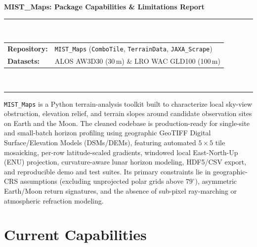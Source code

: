 \documentclass[11pt,letterpaper]{article}
\begin{document}
\noindent
{\LARGE\bfseries\color{navy} MIST\_Maps: Package Capabilities \& Limitations Report}\\[6pt]
\rule{\linewidth}{1.2pt}\\[6pt]
{\small
\begin{tabular}{@{}ll@{}}
  \textbf{Repository:} & \texttt{MIST\_Maps} (\texttt{ComboTile}, \texttt{TerrainData}, \texttt{JAXA\_Scrape}) \\
  \textbf{Datasets:} & ALOS AW3D30 (30\,m) \& LRO WAC GLD100 (100\,m) \\
\end{tabular}}\\[4pt]
\rule{\linewidth}{0.6pt}

\vspace{0.3cm}

\begin{tcolorbox}[colback=boxbg,colframe=navy,boxrule=0.8pt,title={\textbf{Executive Summary}}]
\texttt{MIST\_Maps} is a Python terrain-analysis toolkit built to characterize local sky-view obstruction, elevation relief, and terrain slopes around candidate observation sites on Earth and the Moon. The cleaned codebase is production-ready for single-site and small-batch horizon profiling using geographic GeoTIFF Digital Surface/Elevation Models (DSMs/DEMs), featuring automated $5\times 5$ tile mosaicking, per-row latitude-scaled gradients, windowed local East-North-Up (ENU) projection, curvature-aware lunar horizon modeling, HDF5/CSV export, and reproducible demo and test suites. Its primary constraints lie in geographic-CRS assumptions (excluding unprojected polar grids above $79^\circ$), asymmetric Earth/Moon return signatures, and the absence of sub-pixel ray-marching or atmospheric refraction modeling.
\end{tcolorbox}

\section{Current Capabilities}
\end{document}
